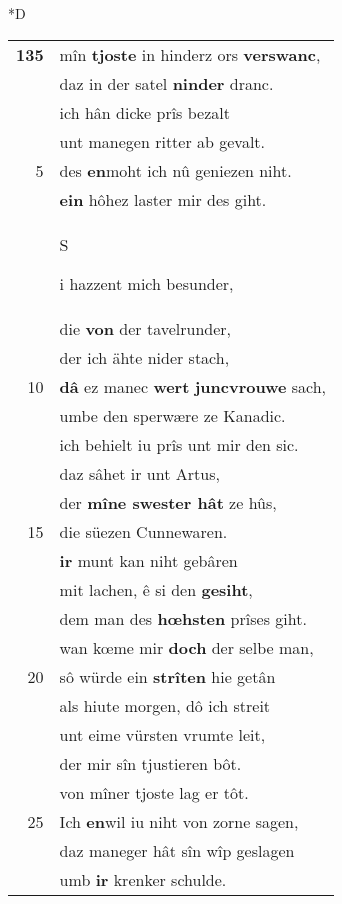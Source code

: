 \documentclass[8pt,a4paper,notitlepage]{article}
\begin{document}
\begin{table}[ht]
\begin{minipage}[t]{0.5\linewidth}
\small
\begin{center}*D
\end{center}
\begin{tabular}{rl}
\textbf{135} & mîn \textbf{tjoste} in hinderz ors \textbf{verswanc},\\ 
 & daz in der satel \textbf{ninder} dranc.\\ 
 & ich hân dicke prîs bezalt\\ 
 & unt manegen ritter ab gevalt.\\ 
5 & des \textbf{en}moht ich nû geniezen niht.\\ 
 & \textbf{ein} hôhez laster mir des giht.\\ 
 & \begin{large}S\end{large}i hazzent mich besunder,\\ 
 & die \textbf{von} der tavelrunder,\\ 
 & der ich ähte nider stach,\\ 
10 & \textbf{dâ} ez manec \textbf{wert} \textbf{juncvrouwe} sach,\\ 
 & umbe den sperwære ze Kanadic.\\ 
 & ich behielt iu prîs unt mir den sic.\\ 
 & daz sâhet ir unt Artus,\\ 
 & der \textbf{mîne swester hât} ze hûs,\\ 
15 & die süezen Cunnewaren.\\ 
 & \textbf{ir} munt kan niht gebâren\\ 
 & mit lachen, ê si den \textbf{gesiht},\\ 
 & dem man des \textbf{hœhsten} prîses giht.\\ 
 & wan kœme mir \textbf{doch} der selbe man,\\ 
20 & sô würde ein \textbf{strîten} hie getân\\ 
 & als hiute morgen, dô ich streit\\ 
 & unt eime vürsten vrumte leit,\\ 
 & der mir sîn tjustieren bôt.\\ 
 & von mîner tjoste lag er tôt.\\ 
25 & Ich \textbf{en}wil iu niht von zorne sagen,\\ 
 & daz maneger hât sîn wîp geslagen\\ 
 & umb \textbf{ir} krenker schulde.\\ 

\end{tabular}
\end{minipage}
\end{table}
\end{document}
